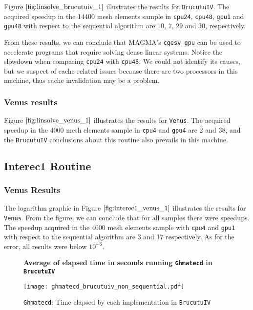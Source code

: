 Figure $\ref{fig:linsolve_brucutuiv_1}$ illustrates the results for \texttt{BrucutuIV}. The acquired speedup in the 14400 mesh 
elements sample in \texttt{cpu24}, \texttt{cpu48}, \texttt{gpu1} and \texttt{gpu48} with respect to 
the sequential algorithm are 10, 7, 29 and 30, respectively. 

From these results, we can conclude that MAGMA's \texttt{cgesv\_gpu} can be used 
to accelerate programs that require solving dense linear systems. Notice the slowdown when comparing 
\texttt{cpu24} with \texttt{cpu48}. We could not identify its causes, but we suspect of cache related issues 
because there are two processors in this machine, thus cache invalidation may be a problem.

\subsubsection{Venus results}

Figure $\ref{fig:linsolve_venus_1}$ illustrates the results 
for \texttt{Venus}. The acquired speedup in the 4000 mesh 
elements sample in \texttt{cpu4} and \texttt{gpu4} are 2 and 38, 
and the \texttt{BrucutuIV} conclusions about this routine also prevails in this machine.

\subsection{Interec1 Routine}

\subsubsection{Venus Results}
The logarithm graphic in Figure $\ref{fig:interec1_venus_1}$ illustrates the results for 
\texttt{Venus}. From the figure, we can conclude that for all samples there were speedups. 
The speedup acquired in the 4000 mesh elements sample with \texttt{cpu4} and \texttt{gpu1} with 
respect to the sequential algorithm are 3 and 17 respectively. As for the error, all results were below  $10^{-6}$.



\begin{figure}[ht]
\centering
\textbf{Average of elapsed time in seconds running \texttt{Ghmatecd} in \texttt{BrucutuIV}}\par\medskip
\texttt{[image: ghmatecd\_brucutuiv\_non\_sequential.pdf]}
\caption{\texttt{Ghmatecd}: Time elapsed by each implementation in \texttt{BrucutuIV}}
\label{fig:ghmatecd_brucutuiv_non_sequential}
\end{figure}

